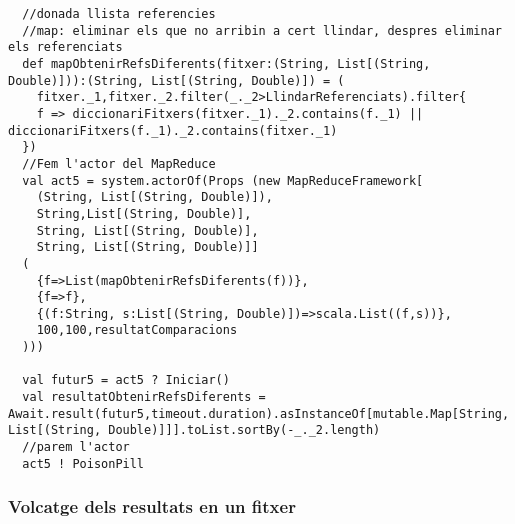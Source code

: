 \documentclass[11pt,a4paper,twoside]{report}
\begin{document}
\begin{lstlisting}
  //donada llista referencies
  //map: eliminar els que no arribin a cert llindar, despres eliminar els referenciats
  def mapObtenirRefsDiferents(fitxer:(String, List[(String, Double)])):(String, List[(String, Double)]) = (
    fitxer._1,fitxer._2.filter(_._2>LlindarReferenciats).filter{
    f => diccionariFitxers(fitxer._1)._2.contains(f._1) || diccionariFitxers(f._1)._2.contains(fitxer._1)
  })
  //Fem l'actor del MapReduce
  val act5 = system.actorOf(Props (new MapReduceFramework[
    (String, List[(String, Double)]),
    String,List[(String, Double)],
    String, List[(String, Double)],
    String, List[(String, Double)]]
  (
    {f=>List(mapObtenirRefsDiferents(f))},
    {f=>f},
    {(f:String, s:List[(String, Double)])=>scala.List((f,s))},
    100,100,resultatComparacions
  )))

  val futur5 = act5 ? Iniciar()
  val resultatObtenirRefsDiferents = Await.result(futur5,timeout.duration).asInstanceOf[mutable.Map[String, List[(String, Double)]]].toList.sortBy(-_._2.length)
  //parem l'actor
  act5 ! PoisonPill
\end{lstlisting}

\subsubsection{Volcatge dels resultats en un fitxer}
\end{document}
